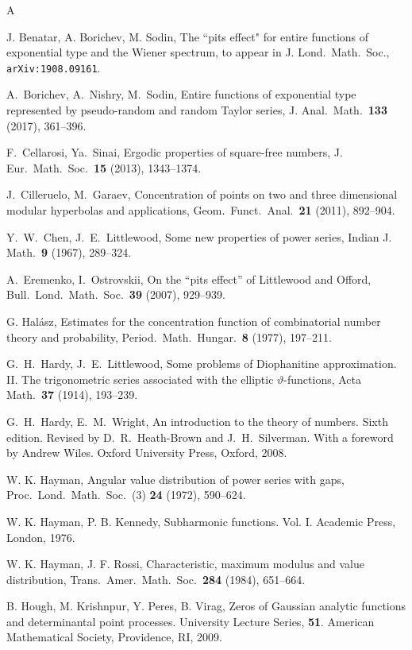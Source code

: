 \documentclass[11pt]{amsart}
\numberwithin{equation}{section}
\begin{document}
\begin{thebibliography}{A}

 J. Benatar, A. Borichev, M. Sodin,
The ``pits effect" for entire functions of exponential type and the Wiener spectrum, to appear in J. Lond.\ Math.\ Soc.,  
{\tt arXiv:1908.09161}.

 A.~Borichev, A.~Nishry, M.~Sodin, Entire functions of exponential type represented by pseudo-random and random Taylor series, J. Anal.\ Math.\ {\bf 133} (2017), 361--396.

 F.~Cellarosi, Ya.~Sinai,
Ergodic properties of square-free numbers,
J. Eur.\ Math.\ Soc.\ {\bf 15} (2013), 1343--1374.

 J.~Cilleruelo, M.~Garaev,
Concentration of points on two and three dimensional modular hyperbolas and applications,
Geom.\ Funct.\ Anal.\ {\bf 21} (2011), 892--904.

 Y.~W.~Chen, J.~E.~Littlewood,
Some new properties of power series, 
Indian J. Math.\ {\bf 9} (1967), 289--324.

A.~Eremenko, I.~Ostrovskii, On the ``pits effect'' of Littlewood and Offord, 
Bull.\ Lond.\ Math.\ Soc.\ {\bf 39} (2007), 929--939.

 G. Hal\'asz,
Estimates for the concentration function of combinatorial number theory and probability, 
Period.\ Math.\ Hungar.\ {\bf 8} (1977), 197--211.

 G.~H.~Hardy, J.~E.~Littlewood,
Some problems of Diophanitine approximation. II.
The trigonometric series associated with the elliptic $\vartheta$-functions, Acta Math.\ {\bf 37} (1914), 193--239. 

 G.~H.~Hardy, E.~M.~Wright,
An introduction to the theory of numbers.
Sixth edition. Revised by D.~R.~Heath-Brown and J.~H.~Silverman. With a foreword by Andrew Wiles.
Oxford University Press, Oxford, 2008.

 W. K. Hayman,
Angular value distribution of power series with gaps, Proc.\ Lond.\ Math.\ Soc.\ (3)
{\bf 24} (1972), 590--624.

 W. K. Hayman, P. B. Kennedy,
Subharmonic functions. Vol. I. Academic Press, London, 1976.

W. K. Hayman, J. F. Rossi,
Characteristic, maximum modulus and value distribution, 
Trans.\ Amer.\ Math.\ Soc.\ {\bf 284} (1984), 651--664.

B. Hough, M. Krishnpur, Y. Peres, B. Virag,
Zeros of Gaussian analytic functions and determinantal point processes.
University Lecture Series, {\bf 51}. American Mathematical Society, Providence, RI, 2009.


\end{thebibliography}
\end{document}
